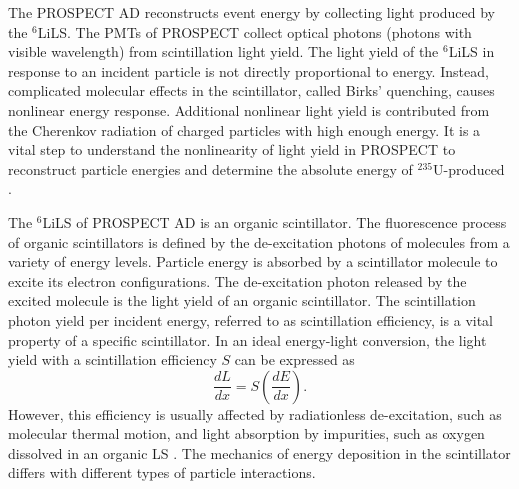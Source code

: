 \label{Ch5}

The PROSPECT AD reconstructs event energy by collecting light produced by the $^6$LiLS.
The PMTs of PROSPECT collect optical photons (photons with visible wavelength) from scintillation light yield. 
The light yield of the $^6$LiLS in response to an incident particle is not directly proportional to energy.
Instead, complicated molecular effects in the scintillator, called Birks' quenching, causes nonlinear energy response. 
Additional nonlinear light yield is contributed from the Cherenkov radiation of charged particles with high enough energy.
It is a vital step to understand the nonlinearity of light yield in PROSPECT to reconstruct particle energies and determine the absolute energy of $^{235}$U-produced \nuebar.


The $^6$LiLS of PROSPECT AD is an organic scintillator.
The fluorescence process of organic scintillators is defined by the de-excitation photons of molecules from a variety of energy levels.
Particle energy is absorbed by a scintillator molecule to excite its electron configurations.
The de-excitation photon released by the excited molecule is the light yield of an organic scintillator.
The scintillation photon yield per incident energy, referred to as scintillation efficiency, is a vital property of a specific scintillator.
In an ideal energy-light conversion, the light yield with a scintillation efficiency $S$ can be expressed as
\begin{equation}
\frac{dL}{dx} = S(\frac{dE}{dx}).
\end{equation}
However, this efficiency is usually affected by radiationless de-excitation, such as molecular thermal motion, and light absorption by impurities, such as oxygen dissolved in an organic LS .
The mechanics of energy deposition in the scintillator differs with different types of particle interactions.

